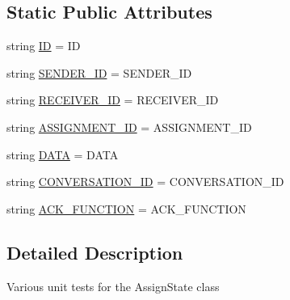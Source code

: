 \subsection*{Static Public Attributes}
\begin{DoxyCompactItemize}
\item 
string \hyperlink{classparlai_1_1mturk_1_1core_1_1dev_1_1test_1_1test__socket__manager_1_1TestPacket_ab59fc860d0a5184e38fcce374b29f984}{ID} = \textquotesingle{}ID\textquotesingle{}
\item 
string \hyperlink{classparlai_1_1mturk_1_1core_1_1dev_1_1test_1_1test__socket__manager_1_1TestPacket_a5c366d5627096646234cd4349f27131a}{S\+E\+N\+D\+E\+R\+\_\+\+ID} = \textquotesingle{}S\+E\+N\+D\+E\+R\+\_\+\+ID\textquotesingle{}
\item 
string \hyperlink{classparlai_1_1mturk_1_1core_1_1dev_1_1test_1_1test__socket__manager_1_1TestPacket_a2ff167946292bd97d83cc5ab28142dfd}{R\+E\+C\+E\+I\+V\+E\+R\+\_\+\+ID} = \textquotesingle{}R\+E\+C\+E\+I\+V\+E\+R\+\_\+\+ID\textquotesingle{}
\item 
string \hyperlink{classparlai_1_1mturk_1_1core_1_1dev_1_1test_1_1test__socket__manager_1_1TestPacket_a3081f9fd5986fe422e717ee11749e2c2}{A\+S\+S\+I\+G\+N\+M\+E\+N\+T\+\_\+\+ID} = \textquotesingle{}A\+S\+S\+I\+G\+N\+M\+E\+N\+T\+\_\+\+ID\textquotesingle{}
\item 
string \hyperlink{classparlai_1_1mturk_1_1core_1_1dev_1_1test_1_1test__socket__manager_1_1TestPacket_af8b189b46d529a80e0cdc60b08e668fe}{D\+A\+TA} = \textquotesingle{}D\+A\+TA\textquotesingle{}
\item 
string \hyperlink{classparlai_1_1mturk_1_1core_1_1dev_1_1test_1_1test__socket__manager_1_1TestPacket_a5e0ec4b121f169037b6a5d62fc424eb9}{C\+O\+N\+V\+E\+R\+S\+A\+T\+I\+O\+N\+\_\+\+ID} = \textquotesingle{}C\+O\+N\+V\+E\+R\+S\+A\+T\+I\+O\+N\+\_\+\+ID\textquotesingle{}
\item 
string \hyperlink{classparlai_1_1mturk_1_1core_1_1dev_1_1test_1_1test__socket__manager_1_1TestPacket_a57f199f5d90d500fb07f8dc101af85e4}{A\+C\+K\+\_\+\+F\+U\+N\+C\+T\+I\+ON} = \textquotesingle{}A\+C\+K\+\_\+\+F\+U\+N\+C\+T\+I\+ON\textquotesingle{}
\end{DoxyCompactItemize}


\subsection{Detailed Description}
\begin{DoxyVerb}Various unit tests for the AssignState class\end{DoxyVerb}
 

